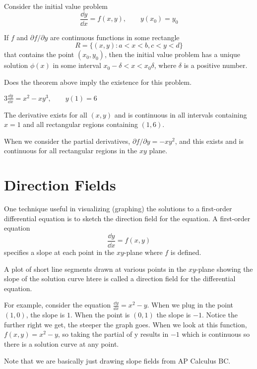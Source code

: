 \documentclass[../diffeq.tex]{subfiles}
\begin{document}
\begin{theorem}
    Consider the initial value problem 
    \[ \frac{\dd y}{\dd x}=f(x,y), \qquad y(x_0)=y_0 \]

    If $f$ and $\partial f/\partial y$ are continuous functions in some rectangle 
    \[ R = \{(x,y): a<x<b, c<y<d\} \]
    that contains the point $(x_0,y_0)$, then the initial value problem has a unique solution $\phi(x)$ in some interval $x_0-\delta<x<x_0\delta$, where $\delta$ is a positive number.
\end{theorem}

\pagebreak
\begin{example}
    Does the theorem above imply the existence for this problem.

    $3\frac{\dd y}{\dd x}=x^2-xy^3, \qquad y(1)=6$

    The derivative exists for all $(x,y)$ and is continuous in all intervals containing $x=1$ and all rectangular regions containing $(1,6)$.

    When we consider the partial derivatives, $\partial f/\partial y = -xy^2$, and this exists and is continuous for all rectangular regions in the $xy$ plane.
\end{example}

\section{Direction Fields}
One technique useful in visualizing (graphing) the solutions to a first-order differential equation is to sketch the direction field for the equation. A first-order equation 
\[ \frac{\dd y}{\dd x}=f(x,y)\]
specifies a slope at each point in the $xy$-plane where $f$ is defined.

\begin{definition}
    A plot of short line segments drawn at various points in the $xy$-plane showing the slope of the solution curve htere is called a direction field for the differential equation.
\end{definition}

For example, consider the equation $\frac{\dd y}{\dd x} = x^2-y$. When we plug in the point $(1,0)$, the slope is $1$. When the point is $(0,1)$ the slope is $-1$. Notice the further right we get, the steeper the graph goes.
When we look at this function, $f(x,y)=x^2-y$, so taking the partial of y results in $-1$ which is continuous so there is a solution curve at any point.

Note that we are basically just drawing slope fields from AP Calculus BC.
\end{document}
